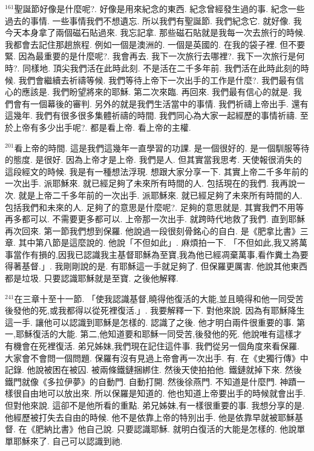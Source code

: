 \documentclass{book}
\begin{document}
$^{161}$聖誕節好像是什麼呢?.
好像是用來紀念的東西.
紀念曾經發生過的事.
紀念一些過去的事情.
一些事情我們不想遺忘.
所以我們有聖誕節.
我們紀念它.
就好像.
我今天本身拿了兩個磁石貼過來.
我忘記拿.
那些磁石貼就是我每一次去旅行的時候.
我都會去記住那趟旅程.
例如一個是澳洲的.
一個是英國的.
在我的袋子裡.
但不要緊.
因為最重要的是什麼呢?.
我會再去.
我下一次旅行去哪裡?.
我下一次旅行是何時?.
同樣地.
頂尖我們活在此時此刻.
不是活在二千多年前.
我們活在此時此刻的時候.
我們會繼續去祈禱等候.
我們等待上帝下一次出手的工作是什麼?.
我們最有信心的應該是.
我們盼望將來的耶穌.
第二次來臨.
再回來.
我們最有信心的就是.
我們會有一個幕後的審判.
另外的就是我們生活當中的事情.
我們祈禱上帝出手.
還有這幾年.
我們有很多很多集體祈禱的時間.
我們同心為大家一起經歷的事情祈禱.
至於上帝有多少出手呢?.
都是看上帝.
看上帝的主權.

$^{201}$看上帝的時間.
這是我們這幾年一直學習的功課.
是一個很好的.
是一個馴服等待的態度.
是很好.
因為上帝才是上帝.
我們是人.
但其實當我思考.
天使報很消失的這段經文的時候.
我是有一種想法浮現.
想跟大家分享一下.
其實上帝二千多年前的一次出手.
派耶穌來.
就已經足夠了未來所有時間的人.
包括現在的我們.
我再說一次.
就是上帝二千多年前的一次出手.
派耶穌來.
就已經足夠了未來所有時間的人.
包括我們和未來的人.
足夠了的意思是什麼呢?.
足夠的意思就是.
其實我們不用等再多都可以.
不需要更多都可以.
上帝那一次出手.
就跨時代地救了我們.
直到耶穌再次回來.
第一節我們想到保羅.
他說過一段很刻骨銘心的自白.
是《肥拿比書》三章.
其中第八節是這麼說的.
他說「不但如此」.
麻煩拍一下.
「不但如此,我又將萬事當作有損的,因我已認識我主基督耶穌為至寶,我為他已經凋棄萬事,看作糞土為要得著基督.」.
我剛剛說的是.
有耶穌這一手就足夠了.
但保羅更厲害.
他說其他東西都是垃圾.
只要認識耶穌就是至寶.
之後他解釋.

$^{241}$在三章十至十一節.
「使我認識基督,曉得他復活的大能,並且曉得和他一同受苦後發他的死,或我都得以從死裡復活.」.
我要解釋一下.
對他來說.
因為有耶穌降生這一手.
讓他可以認識到耶穌是怎樣的.
認識了之後.
他才明白兩件很重要的事.
第一,耶穌復活的大能.
第二,他知道要和耶穌一同受苦,後發他的死.
他說唯有這樣才有機會在死裡復活.
弟兄姊妹,我們現在記住這件事.
我們從另一個角度來看保羅.
大家會不會問一個問題.
保羅有沒有見過上帝會再一次出手.
有.
在《史獨行傳》中記錄.
他說被困在被囚.
被兩條鐵鏈捆綁住.
然後天使拍拍他.
鐵鏈就掉下來.
然後鐵門就像《多拉伊夢》的自動門.
自動打開.
然後徐燕門.
不知道是什麼門.
神蹟一樣很自由地可以放出來.
所以保羅是知道的.
他也知道上帝要出手的時候就會出手.
但對他來說.
這卻不是他所看的重點.
弟兄姊妹,有一樣很重要的事.
我想分享的是.
他經歷被打失去自由的時候.
他不是依靠上帝的特別出手.
他是依靠早就被耶穌基督.
在《肥納比書》他自己說.
只要認識耶穌.
就明白復活的大能是怎樣的.
他說單單耶穌來了.
自己可以認識到祂.
\end{document}
